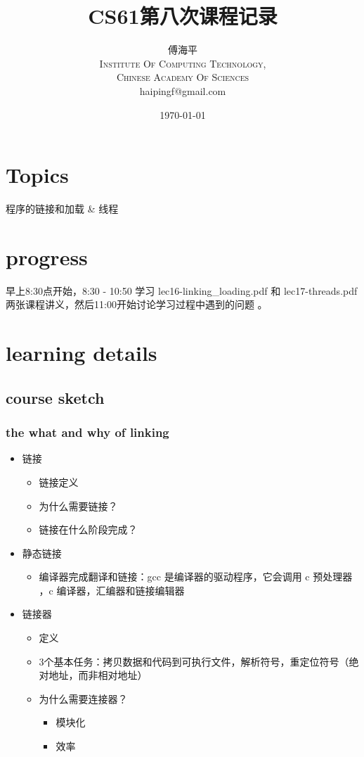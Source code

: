 \documentclass[a4paper, 11pt]{article}
\title{CS61第八次课程记录}
\author{傅海平\\
\textsc{Institute Of Computing Technology,}\\
\textsc{Chinese Academy Of Sciences}\\
haipingf@gmail.com\\
}
\date{\today}
\begin{document}
\maketitle
\newpage
\tableofcontents
\newpage
\section{Topics}
\begin{center}
  \Large{程序的链接和加载 \& 线程}
\end{center}

\section{progress}
早上8:30点开始，8:30 - 10:50 学习 lec16-linking\_loading.pdf 和
lec17-threads.pdf 两张课程讲义，然后11:00开始讨论学习过程中遇到的问题
。
\section{learning details}
\subsection{course sketch}
\subsubsection{the what and why of linking}
\begin{itemize}
  \item{链接}
	\begin{itemize}
	  \item{链接定义}
	  \item{为什么需要链接？}
	  \item{链接在什么阶段完成？}
	  \end{itemize}
  \item{静态链接}
	  \begin{itemize}
		\item{编译器完成翻译和链接：gcc 是编译器的驱动程序，它会调用 c 预处理器
		  ，c 编译器，汇编器和链接编辑器}
		\end{itemize}
   \item{链接器}
	 \begin{itemize}
	   \item{定义}
	   \item{3个基本任务：拷贝数据和代码到可执行文件，解析符号，重定位符号（绝
		 对地址，而非相对地址）}
	   \item{为什么需要连接器？}
		 \begin{itemize}
		   \item{模块化}
		   \item{效率}
		   \end{itemize}
	   \end{itemize}
\end{itemize}
\end{document}
